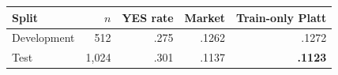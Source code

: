 \begin{tabular}{lrrrr}
\toprule
\textbf{Split} & \textbf{$n$} & \textbf{YES rate} & \textbf{Market} & \textbf{Train-only Platt} \\
\midrule
Development & 512  & .275 & .1262 & .1272 \\
Test & 1,024 & .301 & .1137 & \textbf{.1123} \\
\bottomrule
\end{tabular}
